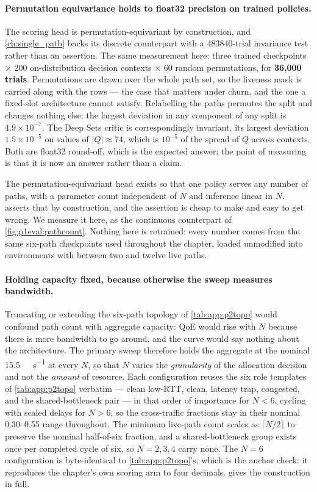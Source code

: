 \paragraph{Permutation equivariance holds to float32 precision on trained policies.} The scoring head
is permutation-equivariant by construction, and \cref{ch:single_path} backs its discrete counterpart
with a 483840-trial invariance test rather than an assertion. The same measurement here: three trained
checkpoints $\times$ 200 on-distribution decision contexts $\times$ 60 random permutations, for
\textbf{36{,}000 trials}. Permutations are drawn over the whole path set, so the liveness mask is
carried along with the rows --- the case that matters under churn, and the one a fixed-slot
architecture cannot satisfy. Relabelling the paths permutes the split and changes nothing else: the
largest deviation in any component of any split is $4.9\times10^{-7}$. The Deep Sets critic is
correspondingly invariant, its largest deviation $1.5\times10^{-5}$ on values of $|Q| \approx 74$, which
is $10^{-5}$ of the spread of $Q$ across contexts. Both are float32 round-off, which is the expected
answer; the point of measuring is that it is now an answer rather than a claim.

The permutation-equivariant head exists so that one policy serves any number of paths, with a parameter
count independent of $N$ and inference linear in $N$.  asserts that by
construction, and the assertion is cheap to make and easy to get wrong. We measure it here, as the
continuous counterpart of \cref{fig:p1eval:pathcount}. Nothing here is retrained: every number comes
from the same six-path checkpoints used throughout the chapter, loaded unmodified into environments with
between two and twelve live paths.

\paragraph{Holding capacity fixed, because otherwise the sweep measures bandwidth.} Truncating or
extending the six-path topology of \cref{tab:app:p2topo} would confound path count with aggregate
capacity: QoE would rise with $N$ because there is more bandwidth to go around, and the curve would say
nothing about the architecture. The primary sweep therefore holds the aggregate at the nominal
\SI{15.5}{\mega\bit\per\second} at every $N$, so that $N$ varies the \emph{granularity} of the
allocation decision and not the \emph{amount} of resource. Each configuration reuses the six role
templates of \cref{tab:app:p2topo} verbatim --- clean low-RTT, clean, latency trap, congested, and the
shared-bottleneck pair --- in that order of importance for $N < 6$, cycling with scaled delays for
$N > 6$, so the cross-traffic fractions stay in their nominal 0.30--0.55 range throughout. The minimum
live-path count scales as $\lceil N/2 \rceil$ to preserve the nominal half-of-six fraction, and a
shared-bottleneck group exists once per completed cycle of six, so $N = 2, 3, 4$ carry none. The $N = 6$
configuration is byte-identical to \cref{tab:app:p2topo}'s, which is the anchor check: it reproduces the
chapter's own scoring arm to four decimals.  gives the construction in full.

